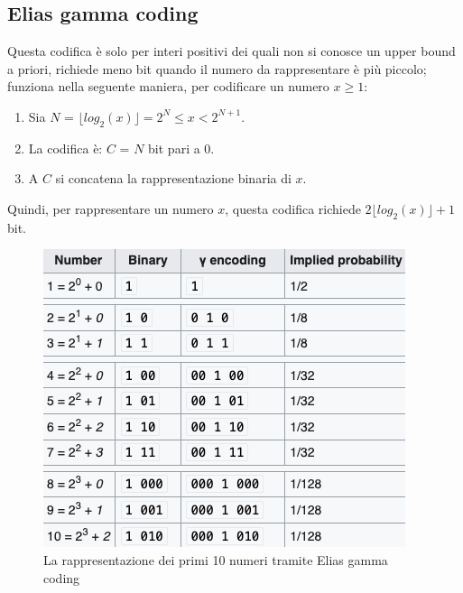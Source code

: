 \documentclass[12pt,a4paper]{article}
\begin{document}
\subsection{Elias gamma coding}
Questa codifica è solo per interi positivi dei quali non si conosce un upper bound a priori, richiede meno bit quando il numero da rappresentare è più piccolo; funziona nella seguente maniera, per codificare un numero $x \geq 1$:
\begin{enumerate}
\item Sia $N$ = $\lfloor log_{2} (x) \rfloor = 2^N \leq x < 2^{N+1}$.
\item La codifica è: $C$ = $N$ bit pari a $0$.
\item A $C$ si concatena la rappresentazione binaria di $x$.
\end{enumerate}
Quindi, per rappresentare un numero $x$, questa codifica richiede $2 \lfloor log_{2} (x) \rfloor + 1$ bit.
\begin{figure}[h]
	\centering
	\includegraphics[width=0.5\linewidth]{img/elias_gamma}
	\caption{La rappresentazione dei primi 10 numeri tramite Elias gamma coding}
	\label{fig:elias_gamma}
\end{figure}
\end{document}
